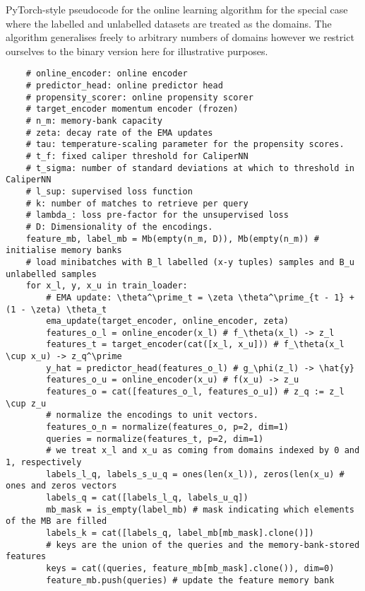 \begin{algorithm}[ht]
     \caption{
         PyTorch-style pseudocode for the online learning algorithm for the special case where the
         labelled and unlabelled datasets are treated as the domains. The algorithm generalises
         freely to arbitrary numbers of domains however we restrict ourselves to the binary version
         here for illustrative purposes.
    }
    \label{alg:ol_pc}
    \begin{verbatim}
    # online_encoder: online encoder
    # predictor_head: online predictor head
    # propensity_scorer: online propensity scorer
    # target_encoder momentum encoder (frozen)
    # n_m: memory-bank capacity
    # zeta: decay rate of the EMA updates
    # tau: temperature-scaling parameter for the propensity scores.
    # t_f: fixed caliper threshold for CaliperNN
    # t_sigma: number of standard deviations at which to threshold in CaliperNN
    # l_sup: supervised loss function
    # k: number of matches to retrieve per query
    # lambda_: loss pre-factor for the unsupervised loss
    # D: Dimensionality of the encodings.
    feature_mb, label_mb = Mb(empty(n_m, D)), Mb(empty(n_m)) # initialise memory banks
    # load minibatches with B_l labelled (x-y tuples) samples and B_u unlabelled samples
    for x_l, y, x_u in train_loader:
        # EMA update: \theta^\prime_t = \zeta \theta^\prime_{t - 1} + (1 - \zeta) \theta_t
        ema_update(target_encoder, online_encoder, zeta)
        features_o_l = online_encoder(x_l) # f_\theta(x_l) -> z_l
        features_t = target_encoder(cat([x_l, x_u])) # f_\theta(x_l \cup x_u) -> z_q^\prime
        y_hat = predictor_head(features_o_l) # g_\phi(z_l) -> \hat{y}
        features_o_u = online_encoder(x_u) # f(x_u) -> z_u
        features_o = cat([features_o_l, features_o_u]) # z_q := z_l \cup z_u
        # normalize the encodings to unit vectors.
        features_o_n = normalize(features_o, p=2, dim=1)
        queries = normalize(features_t, p=2, dim=1)
        # we treat x_l and x_u as coming from domains indexed by 0 and 1, respectively
        labels_l_q, labels_s_u_q = ones(len(x_l)), zeros(len(x_u) # ones and zeros vectors
        labels_q = cat([labels_l_q, labels_u_q])
        mb_mask = is_empty(label_mb) # mask indicating which elements of the MB are filled
        labels_k = cat([labels_q, label_mb[mb_mask].clone()])
        # keys are the union of the queries and the memory-bank-stored features
        keys = cat((queries, feature_mb[mb_mask].clone()), dim=0)
        feature_mb.push(queries) # update the feature memory bank

\end{verbatim}
\end{algorithm}
